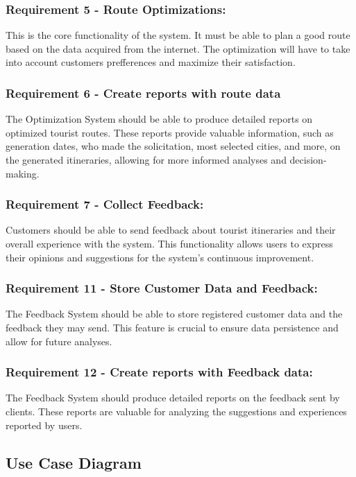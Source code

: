 \subsubsection*{Requirement 5 - Route Optimizations:} This is the core functionality of the system. It must be able to plan a good route based on the data acquired from the internet. The optimization will have to take into account customers prefferences and maximize their satisfaction.

\subsubsection*{Requirement 6 - Create reports with route data} The Optimization System should be able to produce detailed reports on optimized tourist routes. These reports provide valuable information, such as generation dates, who made the solicitation, most selected cities, and more, on the generated itineraries, allowing for more informed analyses and decision-making.

\subsubsection*{Requirement 7 - Collect Feedback:} Customers should be able to send feedback about tourist itineraries and their overall experience with the system. This functionality allows users to express their opinions and suggestions for the system's continuous improvement.


\subsubsection*{Requirement 11 - Store Customer Data and Feedback:} The Feedback System should be able to store registered customer data and the feedback they may send. This feature is crucial to ensure data persistence and allow for future analyses.

\subsubsection*{Requirement 12 - Create reports with Feedback data:} The Feedback System should produce detailed reports on the feedback sent by clients. These reports are valuable for analyzing the suggestions and experiences reported by users.

\subsection*{Use Case Diagram}

